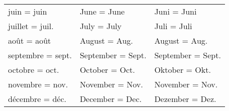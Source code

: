 \begin{table}[!h]
\begin{center}
\begin{tabular}{lll}
       juin = juin        & June = June        & Juni = Juni\\
       juillet = juil.    & July = July        & Juli = Juli\\
       août = août        & August = Aug.      & August = Aug.\\
       septembre = sept.  & September = Sept.  & September = Sept.\\
       octobre = oct.     & October = Oct.     & Oktober = Okt.\\
       novembre = nov.    & November = Nov.    & November = Nov.\\
       décembre = déc.    & December = Dec.    & Dezember = Dez. \\ 
    \hline
   \end{tabular}
   \end{center}
\end{table}
